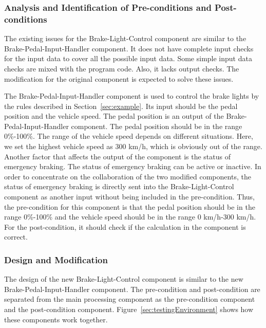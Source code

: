 \subsubsection{Analysis and Identification of Pre-conditions and Post-conditions }

The existing issues for the Brake-Light-Control component are similar to the Brake-Pedal-Input-Handler component. It does not have complete input checks for the input data to cover all the possible input data. Some simple input data checks are mixed with the program code. Also, it lacks output checks. The modification for the original component is expected to solve these issues.

The Brake-Pedal-Input-Handler component is used to control the brake lights by the rules described in Section~\ref{sec:example}. Its input should be the pedal position and the vehicle speed. The pedal position is an output of the Brake-Pedal-Input-Handler component. The pedal position should be in the range 0\%-100\%. The range of the vehicle speed depends on different situations. Here, we set the highest vehicle speed as 300 km/h, which is obviously out of the range. Another factor that affects the output of the component is the status of emergency braking. The status of emergency braking can be active or inactive. In order to concentrate on the collaboration of the two modified components, the status of emergency braking is directly sent into the Brake-Light-Control component as another input without being included in the pre-condition. Thus, the pre-condition for this component is that the pedal position should be in the range 0\%-100\% and the vehicle speed should be in the range 0 km/h-300 km/h. For the post-condition, it should check if the calculation in the component is correct.

\subsubsection{Design and Modification}
 The design of the new Brake-Light-Control component is similar to the new Brake-Pedal-Input-Handler component. The pre-condition and post-condition are separated from the main processing component as the pre-condition component and the post-condition component. Figure~\ref{sec:testingEnvironment} shows how these components work together.

